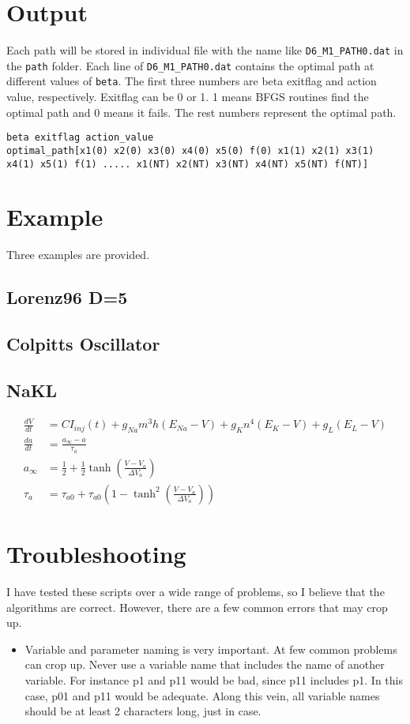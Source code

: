 \documentclass[11pt]{article}
\begin{document}
\section{Output}
Each path will be stored in individual file with the name like \texttt{D6\_M1\_PATH0.dat} in the \texttt{path} folder.  Each line of  \texttt{D6\_M1\_PATH0.dat} contains the optimal path at different values of \texttt{beta}. The first three numbers are beta exitflag and action value, respectively. Exitflag can be 0 or 1. 1 means BFGS routines find the optimal path and 0 means it fails. The rest numbers represent the optimal path.
\begin{verbatim}
beta exitflag action_value 
optimal_path[x1(0) x2(0) x3(0) x4(0) x5(0) f(0) x1(1) x2(1) x3(1) 
x4(1) x5(1) f(1) ..... x1(NT) x2(NT) x3(NT) x4(NT) x5(NT) f(NT)]
\end{verbatim}
\section{Example}
Three examples are provided.
\subsection{Lorenz96 D=5}
\subsection{Colpitts Oscillator}
\subsection{NaKL}
\begin{align*}
\frac{dV}{dt}&=CI_{inj}(t) + g_{Na}m^3h(E_{Na}-V) + g_{K}n^4(E_K-V) + g_L(E_L-V)\\
\frac{da}{dt}&=\frac{a_\infty-a}{\tau_a}\\
a_\infty&=\frac12+\frac12\tanh\left(\frac{V-V_a}{\Delta V_a}\right)\\
\tau_a&=\tau_{a0}+\tau_{a0}\left(1-\tanh^2\left(\frac{V-V_a}{\Delta V_a}\right)\right)
\end{align*}
\section{Troubleshooting}
I have tested these scripts over a wide range of problems, so I believe that the algorithms are correct. However, there are a few common errors that may crop up.
\begin{itemize}
\item Variable and parameter naming is very important. At few common problems can crop up. Never use a variable name that includes the name of another variable. For instance p1 and p11 would be bad, since p11 includes p1. In this case, p01 and p11 would be adequate. Along this vein, all variable names should be at least 2 characters long, just in case.
\end{itemize}
\end{document}
